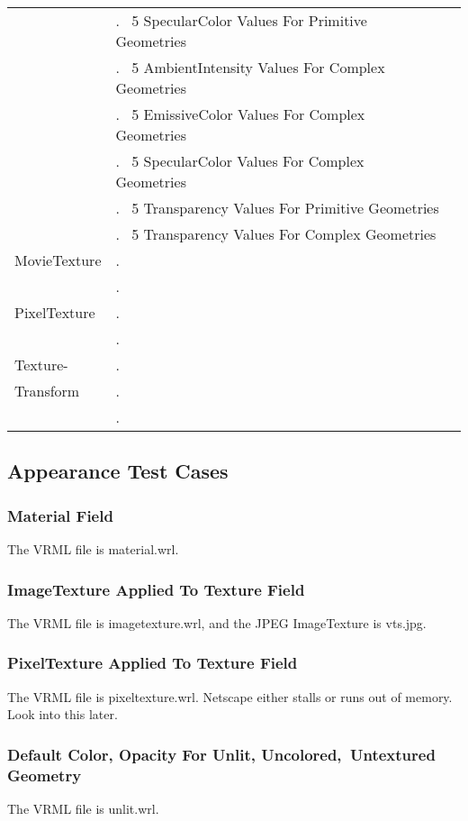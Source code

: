 \documentclass[12pt,letterpaper]{article}
\newcounter{testCaseCtr}
\newcommand{\testCase}{\arabic{testCaseCtr}.~ \stepcounter{testCaseCtr}}
\newcommand{\resetTestCase}{\setcounter{testCaseCtr}{1}}
\newcommand{\AppA}{Material Field}
\newcommand{\AppB}{ImageTexture Applied To Texture Field}
\newcommand{\AppC}{PixelTexture Applied To Texture Field}
\newcommand{\AppDa}{Default Color, Opacity For Unlit, Uncolored,~}
\newcommand{\AppDb}{Untextured Geometry}
\newcommand{\MatX}{5 SpecularColor Values For Primitive Geometries}
\newcommand{\MatY}{5 AmbientIntensity Values For Complex Geometries}
\newcommand{\MatZ}{5 EmissiveColor Values For Complex Geometries}
\newcommand{\MatAA}{5 SpecularColor Values For Complex Geometries}
\newcommand{\MatAB}{5 Transparency Values For Primitive Geometries}
\newcommand{\MatAC}{5 Transparency Values For Complex Geometries}
\begin{document}
\begin{center}
\begin{longtable}{|l|l|l|}
 & \testCase \MatX & \\\cline{2-3}
 & \testCase \MatY & \\\cline{2-3}
 & \testCase \MatZ & \\\cline{2-3}
 & \testCase \MatAA & \\\cline{2-3}
 & \testCase \MatAB & \\\cline{2-3}
 & \testCase \MatAC & \\\hline
\resetTestCase
MovieTexture & \testCase & \\\cline{2-3}
 & \testCase & \\\hline
\resetTestCase
PixelTexture & \testCase & \\\cline{2-3}
 & \testCase & \\\hline
\resetTestCase
Texture- & \testCase & \\\cline{2-3}
Transform & \testCase & \\\cline{2-3}
 & \testCase & \\
\end{longtable}
\end{center}

\subsection{Appearance Test Cases}

\subsubsection{\AppA}
The VRML file is material.wrl.

\subsubsection{\AppB}
\label{sec:imagetexture}
The VRML file is imagetexture.wrl, and the JPEG ImageTexture is vts.jpg.

\subsubsection{\AppC}
The VRML file is pixeltexture.wrl.\newline
Netscape either stalls or runs out of memory.
Look into this later.

\subsubsection{\AppDa\AppDb}
\label{sec:unlit}
The VRML file is unlit.wrl.
\end{document}
